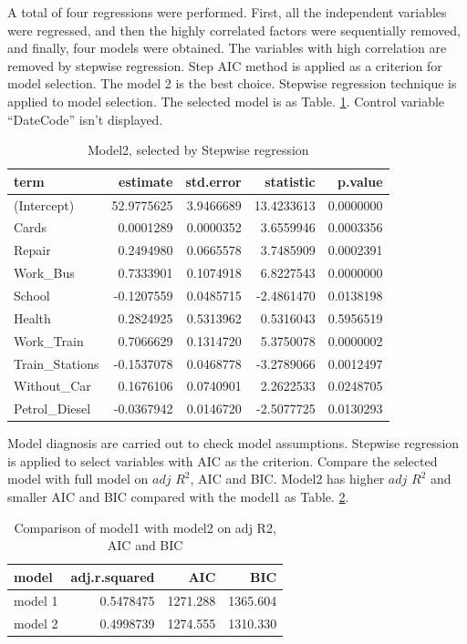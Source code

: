 \documentclass[
]{article}
\begin{document}
A total of four regressions were performed. First, all the independent
variables were regressed, and then the highly correlated factors were
sequentially removed, and finally, four models were obtained. The
variables with high correlation are removed by stepwise regression. Step
AIC method is applied as a criterion for model selection. The model 2 is
the best choice. Stepwise regression technique is applied to model
selection. The selected model is as Table. \ref{tab:model2}. Control
variable ``DateCode'' isn't displayed.

\begin{table}

\caption{\label{tab:unnamed-chunk-9}Model2, selected by Stepwise regression\label{tab:model2}}
\centering
\begin{tabular}[t]{l|r|r|r|r}
\hline
term & estimate & std.error & statistic & p.value\\
\hline
(Intercept) & 52.9775625 & 3.9466689 & 13.4233613 & 0.0000000\\
\hline
Cards & 0.0001289 & 0.0000352 & 3.6559946 & 0.0003356\\
\hline
Repair & 0.2494980 & 0.0665578 & 3.7485909 & 0.0002391\\
\hline
Work\_Bus & 0.7333901 & 0.1074918 & 6.8227543 & 0.0000000\\
\hline
School & -0.1207559 & 0.0485715 & -2.4861470 & 0.0138198\\
\hline
Health & 0.2824925 & 0.5313962 & 0.5316043 & 0.5956519\\
\hline
Work\_Train & 0.7066629 & 0.1314720 & 5.3750078 & 0.0000002\\
\hline
Train\_Stations & -0.1537078 & 0.0468778 & -3.2789066 & 0.0012497\\
\hline
Without\_Car & 0.1676106 & 0.0740901 & 2.2622533 & 0.0248705\\
\hline
Petrol\_Diesel & -0.0367942 & 0.0146720 & -2.5077725 & 0.0130293\\
\hline
\end{tabular}
\end{table}

Model diagnosis are carried out to check model assumptions. Stepwise
regression is applied to select variables with AIC as the criterion.
Compare the selected model with full model on \(adj\) \(R^2\), AIC and
BIC. Model2 has higher \(adj\) \(R^2\) and smaller AIC and BIC compared
with the model1 as Table. \ref{tab:com}.

\begin{table}

\caption{\label{tab:unnamed-chunk-10}Comparison of model1 with model2 on adj R2, AIC and BIC\label{tab:com}}
\centering
\begin{tabular}[t]{l|r|r|r}
\hline
model & adj.r.squared & AIC & BIC\\
\hline
model 1 & 0.5478475 & 1271.288 & 1365.604\\
\hline
model 2 & 0.4998739 & 1274.555 & 1310.330\\
\hline
\end{tabular}
\end{table}
\end{document}
